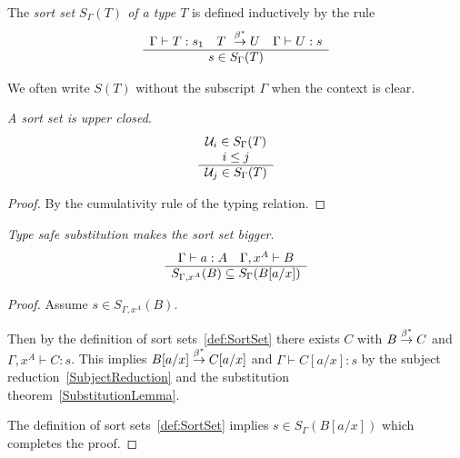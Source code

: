 \begin{definition}
    \label{def:SortSet}
    The \emph{sort set $S_\Gamma(T)$ of a type $T$} is defined inductively by
    the rule
    $$
    \ruleh{
        \Gamma \vdash T : s_1\quad
        T \reducestar U\quad
        \Gamma \vdash U : s
    }
    {
        s \in S_\Gamma(T)
    }
    $$

    We often write $S(T)$ without the subscript $\Gamma$ when the context is
    clear.
\end{definition}





\begin{theorem}
    \label{th:SortSetUpperClosed}
    \emph{A sort set is upper closed}.
    $$
        \begin{array}{c} 
            {\cal U}_i \in S_\Gamma(T)
            \\
            i \le j
         \\ \hline 
            {\cal U}_j \in S_\Gamma(T)
        \end{array}
    $$
    \begin{proof}
        By the cumulativity rule of the typing relation.
    \end{proof}
\end{theorem}






\begin{theorem}
    \label{th:SortSetSubstitution}
    \emph{Type safe substitution makes the sort set bigger}.
    $$
        \begin{array}{c} 
            \Gamma \vdash a : A \quad \Gamma,x^A \vdash B
         \\ \hline 
            S_{\Gamma,x^A}(B) \subseteq S_\Gamma(B[a/x])
        \end{array}
    $$
    \begin{proof}
        Assume $s \in S_{\Gamma,x^A}(B)$.

        Then by the definition of sort sets~\ref{def:SortSet}
        there exists $C$ with $B \stackrel{\beta^*}{\to} C$ and $\Gamma,x^A \vdash C: s$.
        This implies $B[a/x] \stackrel{\beta^*}{\to} C[a/x]$ and $\Gamma \vdash C[a/x] : s$
        by the subject reduction~\ref{SubjectReduction} and the substitution
        theorem~\ref{SubstitutionLemma}.

        The definition of sort sets~\ref{def:SortSet} implies $s \in
        S_\Gamma(B[a/x])$ which completes the proof.
    \end{proof}
\end{theorem}






